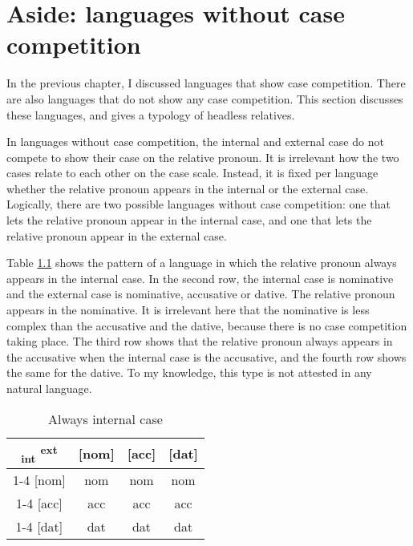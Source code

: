 
\chapter{Aside: languages without case competition}\label{sec:without-case-competition}

In the previous chapter, I discussed languages that show case competition. There are also languages that do not show any case competition. This section discusses these languages, and gives a typology of headless relatives.

In languages without case competition, the internal and external case do not compete to show their case on the relative pronoun. It is irrelevant how the two cases relate to each other on the case scale. Instead, it is fixed per language whether the relative pronoun appears in the internal or the external case. Logically, there are two possible languages without case competition: one that lets the relative pronoun appear in the internal case, and one that lets the relative pronoun appear in the external case.

Table \ref{tbl:no-case-competition-int} shows the pattern of a language in which the relative pronoun always appears in the internal case. In the second row, the internal case is nominative and the external case is nominative, accusative or dative. The relative pronoun appears in the nominative. It is irrelevant here that the nominative is less complex than the accusative and the dative, because there is no case competition taking place. The third row shows that the relative pronoun always appears in the accusative when the internal case is the accusative, and the fourth row shows the same for the dative. To my knowledge, this type is not attested in any natural language.

\begin{table}[ht]
  \center
  \caption{Always internal case}
  \begin{tabular}{c|c|c|c}
    \toprule
   \textsubscript{\ac{int}} \textsuperscript{\ac{ext}}
          & [\ac{nom}]
          & [\ac{acc}]
          & [\ac{dat}]
          \\ \cmidrule{1-4}
      [\ac{nom}]
          & \ac{nom}
          & \ac{nom}
          & \ac{nom}
          \\ \cmidrule{1-4}
      [\ac{acc}]
          & \ac{acc}
          & \ac{acc}
          & \ac{acc}
          \\ \cmidrule{1-4}
      [\ac{dat}]
          & \ac{dat}
          & \ac{dat}
          & \ac{dat}
          \\
    \bottomrule
  \end{tabular}
  \label{tbl:no-case-competition-int}
\end{table}

